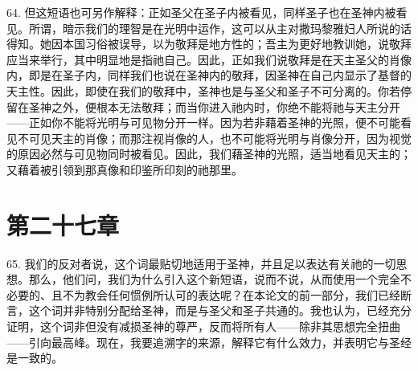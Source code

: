 64. 但这短语也可另作解释：正如圣父在圣子内被看见，同样圣子也在圣神内被看见。所谓，暗示我们的理智是在光明中运作，这可以从主对撒玛黎雅妇人所说的话得知。她因本国习俗被误导，以为敬拜是地方性的；吾主为更好地教训她，说敬拜应当来举行，其中明显地是指祂自己。因此，正如我们说敬拜是在天主圣父的肖像内，即是在圣子内，同样我们也说在圣神内的敬拜，因圣神在自己内显示了基督的天主性。因此，即使在我们的敬拜中，圣神也是与圣父和圣子不可分离的。你若停留在圣神之外，便根本无法敬拜；而当你进入祂内时，你绝不能将祂与天主分开——正如你不能将光明与可见物分开一样。因为若非藉着圣神的光照，便不可能看见不可见天主的肖像；而那注视肖像的人，也不可能将光明与肖像分开，因为视觉的原因必然与可见物同时被看见。因此，我们藉圣神的光照，适当地看见天主的；又藉着被引领到那真像和印鉴所印刻的祂那里。\par


\section{第二十七章}

\par

65. 我们的反对者说，这个词最贴切地适用于圣神，并且足以表达有关祂的一切思想。那么，他们问，我们为什么引入这个新短语，说而不说，从而使用一个完全不必要的、且不为教会任何惯例所认可的表达呢？在本论文的前一部分，我们已经断言，这个词并非特别分配给圣神，而是与圣父和圣子共通的。我也认为，已经充分证明，这个词非但没有减损圣神的尊严，反而将所有人——除非其思想完全扭曲——引向最高峰。现在，我要追溯字的来源，解释它有什么效力，并表明它与圣经是一致的。\par

